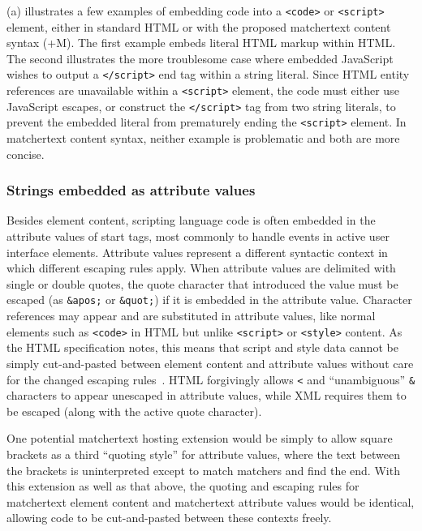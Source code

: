 (a) illustrates a few examples
of embedding code into a \verb|<code>| or \verb|<script>| element,
either in standard HTML or with the proposed matchertext content syntax (+M).
The first example embeds literal HTML markup within HTML.
The second illustrates the more troublesome case
where embedded JavaScript wishes to output
a \verb|</script>| end tag within a string literal.
Since HTML entity references are unavailable within a \verb|<script>| element,
the code must either use JavaScript escapes,
or construct the \verb|</script>| tag from two string literals,
to prevent the embedded literal from prematurely ending
the \verb|<script>| element.
In matchertext content syntax,
neither example is problematic and both are more concise.


\subsubsection{Strings embedded as attribute values}
\label{sec:host:ml:attr}

Besides element content,
scripting language code is often embedded in the attribute values
of \ml start tags,
most commonly to handle events in active user interface elements.
Attribute values represent a different syntactic context
in which different escaping rules apply.
When attribute values are delimited with single or double quotes,
the quote character that introduced the value must be escaped
(as \verb|&apos;| or \verb|&quot;|)
if it is embedded in the attribute value.
Character references may appear and are substituted in attribute values,
like normal elements such as \verb|<code>| in HTML
but unlike \verb|<script>| or \verb|<style>| content.
As the HTML specification notes,
this means that script and style data cannot be simply
cut-and-pasted between element content and attribute values
without care for the changed escaping rules~\cite[App.~B.3.2]{w3c99html401}.
HTML forgivingly allows \verb|<| and ``unambiguous'' \verb|&| characters
to appear unescaped in attribute values,
while XML requires them to be escaped (along with the active quote character).

One potential matchertext hosting extension
would be simply to allow square brackets as a third ``quoting style''
for attribute values,
where the text between the brackets is uninterpreted
except to match matchers and find the end.
With this extension as well as that above,
the quoting and escaping rules for matchertext element content
and matchertext attribute values would be identical,
allowing code to be cut-and-pasted between these contexts freely.


